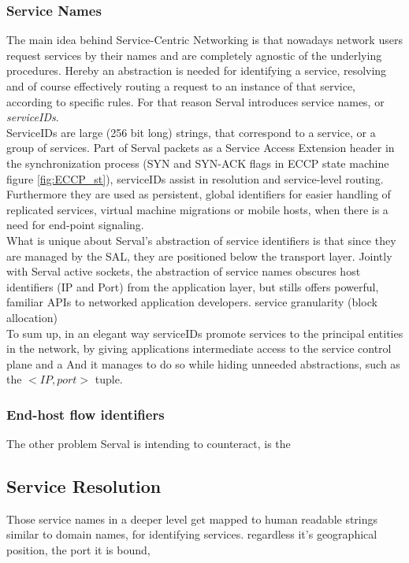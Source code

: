 \subsubsection{Service Names}
The main idea behind Service-Centric Networking is that nowadays network users request services by their names and are completely agnostic of the underlying procedures.
Hereby an abstraction is needed for identifying a service, resolving and of course effectively routing a request to an instance of that service, according to specific rules.
For that reason Serval introduces service names, or \emph{serviceIDs}.\\
\indent ServiceIDs are large (256 bit long) strings, that correspond to a service, or a group of services.
Part of Serval packets as a Service Access Extension header in the synchronization process (SYN and SYN-ACK flags in ECCP state machine figure \ref{fig:ECCP_st}), serviceIDs assist in resolution and service-level routing.
Furthermore they are used as persistent, global identifiers for easier handling of replicated services, virtual machine migrations or mobile hosts, when there is a need for end-point signaling.\\
\indent What is unique about Serval's abstraction of service identifiers is that since they are managed by the SAL, they are positioned below the transport layer.
Jointly with Serval active sockets, the abstraction of service names obscures host identifiers (IP and Port) from the application layer, but stills offers powerful, familiar APIs to networked application developers.
\indent service granularity (block allocation) \\
\indent To sum up, in an elegant way serviceIDs promote services to the principal entities in the network, by giving applications intermediate access to the service control plane and a
And it manages to do so while hiding unneeded abstractions, such as the $<IP, port>$ tuple.

\subsubsection{End-host flow identifiers}
The other problem Serval is intending to counteract, is the 

\subsection{Service Resolution}
Those service names in a deeper level get mapped to 
human readable strings similar to domain names, for identifying services.
regardless it's geographical position, the port it is bound, 


